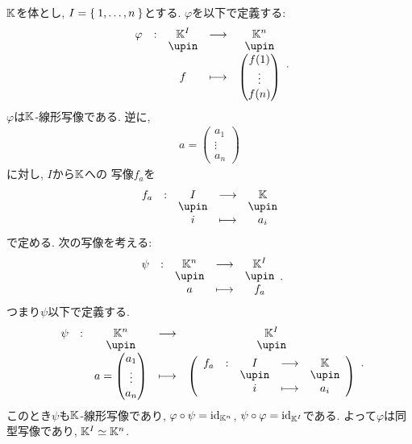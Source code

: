 \begin{example}
  $\mathbb{K}$を体とし, $I=\Set{1,\dots,n}$とする.
  $\varphi$を以下で定義する:
  \begin{align*}
    \shazo{\varphi}{\KK^I}{\KK^n}{f}{\begin{pmatrix}f(1)\\\vdots\\f(n)\end{pmatrix}}.
  \end{align*}
  $\varphi$は$\mathbb{K}$-線形写像である.
  逆に,
  \begin{align*}
    a=
    \begin{pmatrix}
      a_1\\\vdots\\a_n
    \end{pmatrix}
  \end{align*}
  に対し,
  $I$から$\mathbb{K}$への
  写像$f_a$を
  \begin{align*}
    \shazo{f_a}{I}{\KK}{i}{a_i}
  \end{align*}
  で定める.
  次の写像を考える:
  \begin{align*}
    \shazo{\psi}{\KK^n}{\KK^I}{a}{f_a}.
  \end{align*}
  つまり$\psi$以下で定義する.
  \begin{align*}
    \shazo{\psi}{\KK^n}{\KK^I}{a=
    \begin{pmatrix}
      a_1\\\vdots\\a_n
    \end{pmatrix}
  }{\left(\shazo{f_a}{I}{\KK}{i}{a_i}\right)}.
  \end{align*}
  このとき$\psi$も$\mathbb{K}$-線形写像であり,
  $\varphi\circ\psi=\operatorname{id}_{\mathbb{K}^n}$,
  $\psi\circ\varphi=\operatorname{id}_{\mathbb{K}^I}$である.
  よって$\varphi$は同型写像であり,
  $\mathbb{K}^I\simeq \mathbb{K}^n$.
\end{example}

